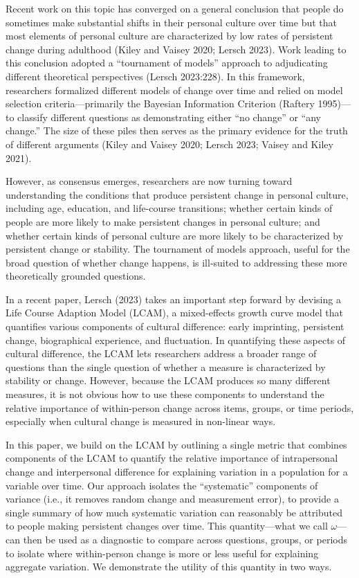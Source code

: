 \documentclass[
  11pt,
]{article}
\begin{document}
Recent work on this topic has converged on a general conclusion that
people do sometimes make substantial shifts in their personal culture
over time but that most elements of personal culture are characterized
by low rates of persistent change during adulthood (Kiley and Vaisey
2020; Lersch 2023). Work leading to this conclusion adopted a
``tournament of models'' approach to adjudicating different theoretical
perspectives (Lersch 2023:228). In this framework, researchers
formalized different models of change over time and relied on model
selection criteria---primarily the Bayesian Information Criterion
(Raftery 1995)---to classify different questions as demonstrating either
``no change'' or ``any change.'' The size of these piles then serves as
the primary evidence for the truth of different arguments (Kiley and
Vaisey 2020; Lersch 2023; Vaisey and Kiley 2021).

However, as consensus emerges, researchers are now turning toward
understanding the conditions that produce persistent change in personal
culture, including age, education, and life-course transitions; whether
certain kinds of people are more likely to make persistent changes in
personal culture; and whether certain kinds of personal culture are more
likely to be characterized by persistent change or stability. The
tournament of models approach, useful for the broad question of whether
change happens, is ill-suited to addressing these more theoretically
grounded questions.

In a recent paper, Lersch (2023) takes an important step forward by
devising a Life Course Adaption Model (LCAM), a mixed-effects growth
curve model that quantifies various components of cultural difference:
early imprinting, persistent change, biographical experience, and
fluctuation. In quantifying these aspects of cultural difference, the
LCAM lets researchers address a broader range of questions than the
single question of whether a measure is characterized by stability or
change. However, because the LCAM produces so many different measures,
it is not obvious how to use these components to understand the relative
importance of within-person change across items, groups, or time
periods, especially when cultural change is measured in non-linear ways.

In this paper, we build on the LCAM by outlining a single metric that
combines components of the LCAM to quantify the relative importance of
intrapersonal change and interpersonal difference for explaining
variation in a population for a variable over time. Our approach
isolates the ``systematic'' components of variance (i.e., it removes
random change and measurement error), to provide a single summary of how
much systematic variation can reasonably be attributed to people making
persistent changes over time. This quantity---what we call
\(\omega\)---can then be used as a diagnostic to compare across
questions, groups, or periods to isolate where within-person change is
more or less useful for explaining aggregate variation. We demonstrate
the utility of this quantity in two ways.
\end{document}

